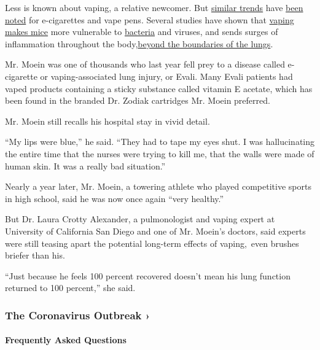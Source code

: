 Less is known about vaping, a relative newcomer. But
\href{https://www.bmj.com/content/366/bmj.l5275}{similar trends} have
\href{https://www.jci.org/articles/view/128531}{been noted} for
e-cigarettes and vape pens. Several studies have shown that
\href{https://pubmed.ncbi.nlm.nih.gov/25651083/}{vaping makes mice} more
vulnerable to \href{https://pubmed.ncbi.nlm.nih.gov/26804311/}{bacteria}
and viruses, and sends surges of inflammation throughout the
body,\href{https://pubmed.ncbi.nlm.nih.gov/29384700/}{beyond the
boundaries of the lungs}.

Mr. Moein was one of thousands who last year fell prey to a disease
called e-cigarette or vaping-associated lung injury, or Evali. Many
Evali patients had vaped products containing a sticky substance called
vitamin E acetate, which has been found in the branded Dr. Zodiak
cartridges Mr. Moein preferred.

Mr. Moein still recalls his hospital stay in vivid detail.

``My lips were blue,'' he said. ``They had to tape my eyes shut. I was
hallucinating the entire time that the nurses were trying to kill me,
that the walls were made of human skin. It was a really bad situation.''

Nearly a year later, Mr. Moein, a towering athlete who played
competitive sports in high school, said he was now once again ``very
healthy.''

But Dr. Laura Crotty Alexander, a pulmonologist and vaping expert at
University of California San Diego and one of Mr. Moein's doctors, said
experts were still teasing apart the potential long-term effects of
vaping,~even brushes briefer than his.

``Just because he feels 100 percent recovered doesn't mean his lung
function returned to 100 percent,'' she said.

\href{https://www.nytimes3xbfgragh.onion/news-event/coronavirus?action=click\&pgtype=Article\&state=default\&region=MAIN_CONTENT_3\&context=storylines_faq}{}

\hypertarget{the-coronavirus-outbreak-}{%
\subsubsection{The Coronavirus Outbreak
›}\label{the-coronavirus-outbreak-}}

\hypertarget{frequently-asked-questions}{%
\paragraph{Frequently Asked
Questions}\label{frequently-asked-questions}}

